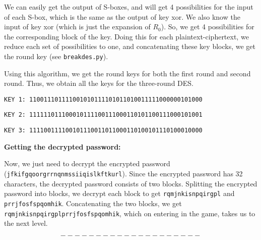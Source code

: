 \documentclass[11pt]{article}
\begin{document}
We can easily get the output of S-boxes, and will get 4 possibilities for the input of each S-box, which is the same as the output of key xor. We also know the input of key xor (which is just the expansion of $R_0$). So, we get 4 possibilities for the corresponding block of the key. Doing this for each plaintext-ciphertext, we reduce each set of possibilities to one, and concatenating these key blocks, we get the round key (see \texttt{breakdes.py}).
\medskip

Using this algorithm, we get the round keys for both the first round and second round. Thus, we obtain all the keys for the three-round DES.
\medskip

\begin{center}
  \texttt{KEY 1: 110011101111001010111101011010011111000000101000}

\texttt{KEY 2: 111111011100010111100111000110101100111000101001}

\texttt{KEY 3: 111100111100101110011011000110100101110100010000}
\end{center}
\medskip

\bigskip
\textbf{Getting the decrypted password:}
\medskip

Now, we just need to decrypt the encrypted password (\texttt{jfkifgqoorgrrnqnmssiiqislkftkurl}). Since the encrypted password has 32 characters, the decrypted password consists of two blocks. Splitting the encrypted password into blocks, we decrypt each block to get \texttt{rqmjnkisnpqirgpl} and \texttt{prrjfosfspqomhik}. Concatenating the two blocks, we get \texttt{rqmjnkisnpqirgplprrjfosfspqomhik}, which on entering in the game, takes us to the next level.

$$--------------------$$
\end{document}
